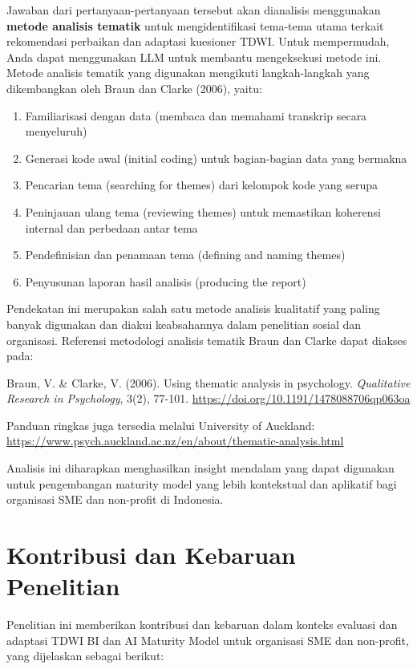 \documentclass{article}
\begin{document}
Jawaban dari pertanyaan-pertanyaan tersebut akan dianalisis menggunakan \textbf{metode analisis tematik} untuk mengidentifikasi tema-tema utama terkait rekomendasi perbaikan dan adaptasi kuesioner TDWI. Untuk mempermudah, Anda dapat menggunakan LLM untuk membantu mengeksekusi metode ini. Metode analisis tematik yang digunakan mengikuti langkah-langkah yang dikembangkan oleh Braun dan Clarke (2006), yaitu:

\begin{enumerate}
	\item Familiarisasi dengan data (membaca dan memahami transkrip secara menyeluruh)
	\item Generasi kode awal (initial coding) untuk bagian-bagian data yang bermakna
	\item Pencarian tema (searching for themes) dari kelompok kode yang serupa
	\item Peninjauan ulang tema (reviewing themes) untuk memastikan koherensi internal dan perbedaan antar tema
	\item Pendefinisian dan penamaan tema (defining and naming themes)
	\item Penyusunan laporan hasil analisis (producing the report)
\end{enumerate}

Pendekatan ini merupakan salah satu metode analisis kualitatif yang paling banyak digunakan dan diakui keabsahannya dalam penelitian sosial dan organisasi. Referensi metodologi analisis tematik Braun dan Clarke dapat diakses pada:

Braun, V. \& Clarke, V. (2006). Using thematic analysis in psychology. \textit{Qualitative Research in Psychology}, 3(2), 77-101.  
\url{https://doi.org/10.1191/1478088706qp063oa}

Panduan ringkas juga tersedia melalui University of Auckland:  
\url{https://www.psych.auckland.ac.nz/en/about/thematic-analysis.html}

Analisis ini diharapkan menghasilkan insight mendalam yang dapat digunakan untuk pengembangan maturity model yang lebih kontekstual dan aplikatif bagi organisasi SME dan non-profit di Indonesia.


\section{Kontribusi dan Kebaruan Penelitian}
Penelitian ini memberikan kontribusi dan kebaruan dalam konteks evaluasi dan adaptasi TDWI BI dan AI Maturity Model untuk organisasi SME dan non-profit, yang dijelaskan sebagai berikut:
\end{document}
